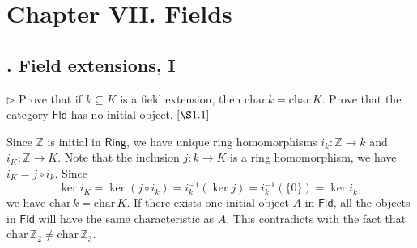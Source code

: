 \documentclass[12pt,letterpaper,boxed]{hmcpset}
\begin{document}
	
	

\newpage
\section{Chapter VII.\hspace{0.2em} Fields}
\subsection{. Field extensions, I}
\begin{problem}[1.1]
$\triangleright$ Prove that if $k \subseteq K$ is a field extension, then $\mathrm{char}\,k=\mathrm{char}\,K$. Prove that the category $\mathsf{Fld}$ has no initial object. $[\S 1.1]$
\end{problem}
\begin{solution}
	Since $\mathbb{Z}$ is initial in $\mathsf{Ring}$, we have unique ring homomorphisms $i_k: \mathbb{Z} \rightarrow k$ and $i_K: \mathbb{Z} \rightarrow K$. Note that the inclusion $j:k\rightarrow K$ is a ring homomorphism, we have $i_K=j\circ i_k$. Since
	\[
	\ker i_K=\ker(j\circ i_k)=i_{k}^{-1}(\ker j)=i_{k}^{-1}(\{0\})=\ker i_k,
	\]
	we have $\mathrm{char}\,k=\mathrm{char}\,K$. If there exists one initial object $A$ in $\mathsf{Fld}$, all the objects in $\mathsf{Fld}$ will have the same characteristic as $A$. This contradicts with the fact that $\mathrm{char}\,{\mathbb{Z}}_2 \ne \mathrm{char}\,\mathbb{Z}_3$.
\end{solution}
\end{document}
